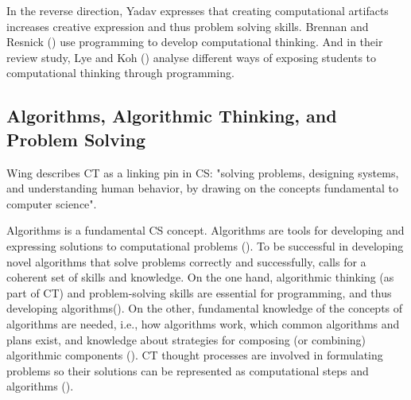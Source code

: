 In the reverse direction, Yadav \cite{Yadav2017CTteacherEd} expresses that creating computational artifacts increases creative expression and thus problem solving skills. Brennan and Resnick (\cite{BrennanResnick2012}) use programming to develop computational thinking. And in their review study, Lye and Koh (\cite{LyeKoh2014}) analyse different ways of exposing students to computational thinking through programming.





\subsection{Algorithms, Algorithmic Thinking, and Problem Solving}


Wing \cite{Wing2006}describes CT as a linking pin in CS: "solving problems, designing systems, and understanding human behavior, by drawing on the concepts fundamental to computer science".

Algorithms is a fundamental CS concept. Algorithms are tools for developing and expressing solutions to computational problems (\cite{GroverPea2013}). To be successful in developing novel algorithms that solve problems correctly and successfully, calls for a coherent set of skills and knowledge. On the one hand, algorithmic thinking (as part of CT) and problem-solving skills are essential for programming, and thus developing algorithms(\cite{McCracken2001}). On the other, fundamental knowledge of the concepts of algorithms are needed, i.e., how algorithms work, which common algorithms and plans exist, and knowledge about strategies for composing (or combining) algorithmic components (\cite{deRaadt2008}). CT thought processes are involved in formulating problems so their solutions can be represented as computational steps and algorithms (\cite{aho2012computation}).



